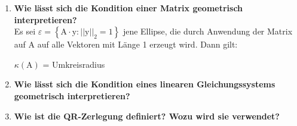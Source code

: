 \begin{enumerate}
		\item \textbf{Wie lässt sich die Kondition einer Matrix geometrisch interpretieren?} \\
			Es sei \(\varepsilon=\left\lbrace \text{A}\cdot\text{y}:||\text{y}||_2=1 \right\rbrace \) jene Ellipse, die durch Anwendung der Matrix auf A auf alle Vektoren mit Länge 1 erzeugt wird. Dann gilt:\\
			\begin{centering}
				\(\kappa(\text{A}) \) = Umkreisradius
			\end{centering}
		
		\item \textbf{Wie lässt sich die Kondition eines linearen Gleichungssystems geometrisch interpretieren?} \\
		
		\item \textbf{Wie ist die QR-Zerlegung definiert? Wozu wird sie verwendet?} \\
		
	\end{enumerate}